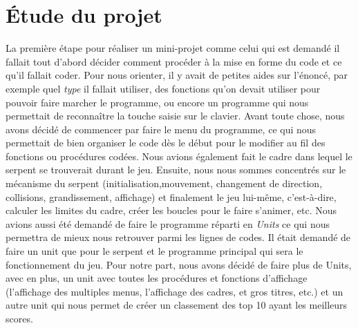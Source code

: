 \documentclass[12pt]{article}
\begin{document}
\section{Étude du projet}
La première étape pour réaliser un mini-projet comme celui qui est demandé il fallait tout d'abord décider comment procéder à la mise en forme du code et ce qu'il fallait coder. 
Pour nous orienter, il y avait de petites aides sur l'énoncé, par exemple quel \emph{type} il fallait utiliser, des fonctions qu'on devait utiliser pour pouvoir faire marcher le programme, ou encore un programme qui nous permettait de reconnaître la touche saisie sur le clavier.
Avant toute chose, nous avons décidé de commencer par faire le menu du programme, ce qui nous permettait de bien organiser le code dès le début pour le modifier au fil des fonctions ou procédures codées. Nous avions également fait le cadre dans lequel le serpent se trouverait durant le jeu. Ensuite, nous nous sommes concentrés sur le mécanisme du serpent (initialisation,mouvement, changement de direction, collisions, grandissement, affichage) et finalement le jeu lui-même, c'est-à-dire, calculer les limites du cadre, créer les boucles pour le faire s'animer, etc.
Nous avions aussi été demandé de faire le programme réparti en \emph{Units} ce qui nous permettra de mieux nous retrouver parmi les lignes de codes. Il était demandé de faire un unit que pour le serpent et le programme principal qui sera le fonctionnement du jeu. Pour notre part, nous avons décidé de faire plus de Units, avec en plus, un unit avec toutes les procédures et fonctions d'affichage (l'affichage des multiples menus, l'affichage des cadres, et gros titres, etc.) et un autre unit qui nous permet de créer un classement des top 10 ayant les meilleurs scores. 
\end{document}
